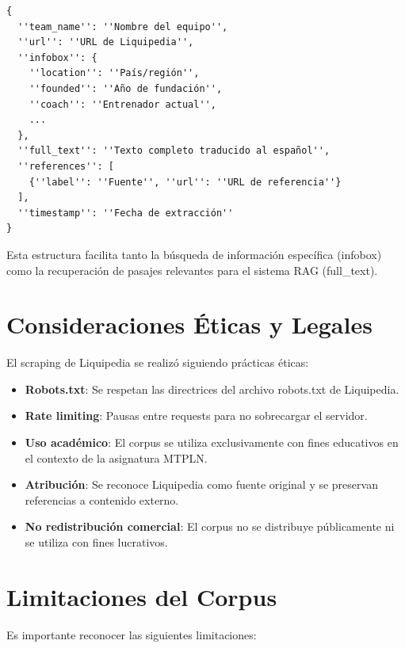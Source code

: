 \begin{verbatim}
{
  ''team_name'': ''Nombre del equipo'',
  ''url'': ''URL de Liquipedia'',
  ''infobox'': {
    ''location'': ''País/región'',
    ''founded'': ''Año de fundación'',
    ''coach'': ''Entrenador actual'',
    ...
  },
  ''full_text'': ''Texto completo traducido al español'',
  ''references'': [
    {''label'': ''Fuente'', ''url'': ''URL de referencia''}
  ],
  ''timestamp'': ''Fecha de extracción''
}
\end{verbatim}

Esta estructura facilita tanto la búsqueda de información específica (infobox) como la recuperación de pasajes relevantes para el sistema RAG (full\_text).

\section{Consideraciones Éticas y Legales}

El scraping de Liquipedia se realizó siguiendo prácticas éticas:

\begin{itemize}
    \item \textbf{Robots.txt}: Se respetan las directrices del archivo robots.txt de Liquipedia.
    \item \textbf{Rate limiting}: Pausas entre requests para no sobrecargar el servidor.
    \item \textbf{Uso académico}: El corpus se utiliza exclusivamente con fines educativos en el contexto de la asignatura MTPLN.
    \item \textbf{Atribución}: Se reconoce Liquipedia como fuente original y se preservan referencias a contenido externo.
    \item \textbf{No redistribución comercial}: El corpus no se distribuye públicamente ni se utiliza con fines lucrativos.
\end{itemize}

\section{Limitaciones del Corpus}

Es importante reconocer las siguientes limitaciones:

